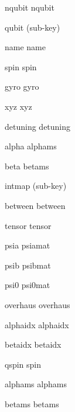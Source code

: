 \begin{DoxyItemize}
\item nqubit nqubit
\item qubit (sub-\/key)
\item name name
\item spin spin
\item gyro gyro
\item xyz xyz
\item detuning detuning
\item alpha alphams
\item beta betams
\item intmap (sub-\/key)
\item between between
\item tensor tensor
\item psia psiamat
\item psib psibmat
\item psi0 psi0mat
\item overhaus overhaus
\item alphaidx alphaidx
\item betaidx betaidx
\item qspin spin
\item alphams alphams
\item betams betams 
\end{DoxyItemize}